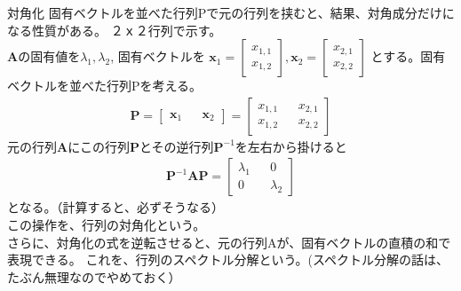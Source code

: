 \documentclass[dvipdfmx,autodetect-engine, unicode, 10pt, aspectratio=169]{beamer}
\begin{document}
\begin{frame}{対角化}
    固有ベクトルを並べた行列Pで元の行列を挟むと、結果、対角成分だけになる性質がある。
    ２ｘ２行列で示す。\\
    $\bm{A}$の固有値を$\lambda_1, \lambda_2$, 固有ベクトルを
    $\bm{x}_1=\begin{bmatrix}
        x_{1,1} \\ x_{1,2}
    \end{bmatrix}, \bm{x}_2=\begin{bmatrix}
        x_{2,1} \\ x_{2,2}
    \end{bmatrix}$
    とする。固有ベクトルを並べた行列Pを考える。
    \begin{align*}
        \bm{P} = \begin{bmatrix}
            \bm{x}_1&&\bm{x}_2
        \end{bmatrix} = \begin{bmatrix}
            x_{1,1} && x_{2,1} \\
            x_{1,2} && x_{2,2}
        \end{bmatrix}
    \end{align*}
    元の行列$\bm{A}$にこの行列$\bm{P}$とその逆行列$\bm{P}^{-1}$を左右から掛けると
    \begin{align*}
        \bm{P}^{-1}\bm{A}\bm{P} = \begin{bmatrix}
            \lambda_1 && 0 \\
            0 && \lambda_2
        \end{bmatrix}
    \end{align*}
    となる。（計算すると、必ずそうなる）\\
    この操作を、行列の対角化という。\\
    さらに、対角化の式を逆転させると、元の行列Aが、固有ベクトルの直積の和で表現できる。
    これを、行列のスペクトル分解という。\footnotesize (スペクトル分解の話は、たぶん無理なのでやめておく）
\end{frame}
\end{document}
